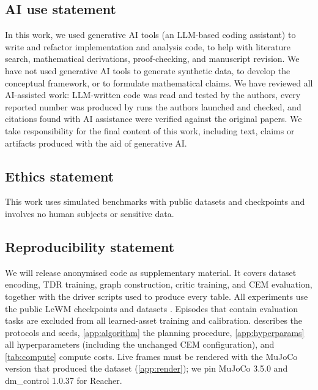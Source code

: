 \documentclass{article} %
\theoremstyle{definition}
\theoremstyle{remark}
\begin{document}
\subsection*{AI use statement}
In this work, we used generative AI tools (an LLM-based coding assistant) to write and refactor
implementation and analysis code, to help with literature search, mathematical derivations, proof-checking, and manuscript revision. We have not
used generative AI tools to generate synthetic data, to develop the conceptual framework, or to
formulate mathematical claims. We have reviewed all AI-assisted work: LLM-written code was read
and tested by the authors, every reported number was produced by runs the authors launched and
checked, and citations found with AI assistance were verified against the original papers. We
take responsibility for the final content of this work, including text, claims or artifacts
produced with the aid of generative AI. 

\subsection*{Ethics statement}
This work uses simulated benchmarks with public datasets and checkpoints and involves no human
subjects or sensitive data.

\subsection*{Reproducibility statement}
We will release anonymised code as supplementary material. It covers dataset encoding, TDR
training, graph construction, critic training, and CEM evaluation, together with the driver
scripts used to produce every table. All experiments use the public LeWM checkpoints
and datasets \citep{lewm}. Episodes that contain evaluation tasks are excluded from all
learned-asset training and calibration.  describes the protocols and seeds,
\cref{app:algorithm} the planning procedure, \cref{app:hyperparams} all hyperparameters
(including the unchanged CEM configuration), and \cref{tab:compute} compute costs. Live
frames must be rendered with the MuJoCo version that produced the dataset
(\cref{app:render}); we pin MuJoCo 3.5.0 and dm\_control 1.0.37 for Reacher.

\end{document}
